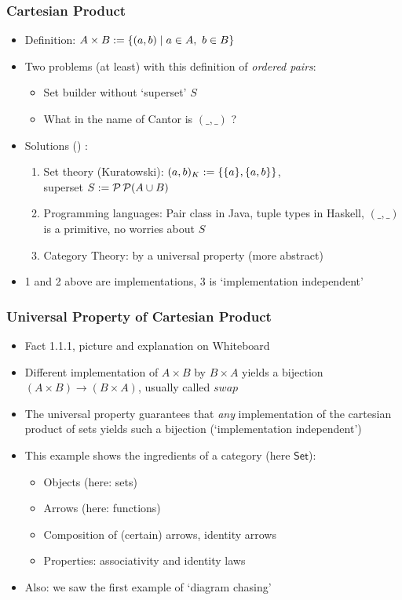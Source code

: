 \documentclass[handout]{beamer}
\newcommand{\Set}{\mathsf{Set}}
\begin{document}
\frame
  {   
    \frametitle{Cartesian Product}\label{Ch1:CartesianProduct}

 \begin{itemize}[<+->]
\item Definition: $A\times B := \{(a,b) \mid a\in A,~b\in B\}$
\item Two problems (at least) with this definition of \emph{ordered pairs}:
   \begin{itemize}[<+->]
\item Set builder without `superset' $S$
\item What in the name of Cantor is $(\_,\_)$ ?
   \end{itemize}
\item Solutions  () :
 \begin{enumerate}[<+->]
\item Set theory (Kuratowski): $(a,b)_K := \{\{a\},\{a,b\}\}$, \\
           superset $S:= \operatorname{\mathcal{P}}\operatorname{\mathcal{P}}(A\cup B)$
\item Programming languages: Pair class in Java, tuple types in Haskell,
$(\_,\_)$ is a primitive, no worries about $S$
\item Category Theory: by a universal property (more abstract)
 \end{enumerate}
\item 1 and 2 above are implementations, 3 is `implementation independent'
 \end{itemize}

 }


\frame
  {   
    \frametitle{Universal Property of Cartesian Product}\label{Ch1:CartesianProductUP}

 \begin{itemize}[<+->]
\item Fact 1.1.1, picture and explanation on Whiteboard
\item Different implementation of $A\times B$ by $B\times A$ yields a bijection
$(A\times B) \to (B\times A)$, usually called $swap$
\item The universal property guarantees that \emph{any} implementation
of the cartesian product of sets yields such a bijection (`implementation independent')
\item This example shows the ingredients of a category (here $\Set$):
   \begin{itemize}[<+->]
\item Objects (here: sets)
\item Arrows (here: functions)
\item Composition of (certain) arrows, identity arrows
\item Properties: associativity and identity laws
   \end{itemize}
\item Also: we saw the first example of `diagram chasing'
 \end{itemize}

 }
\end{document}
